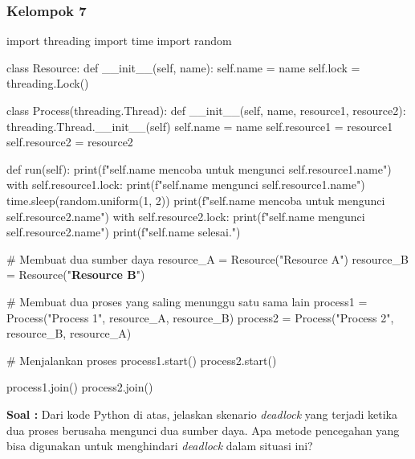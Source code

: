 \documentclass[12pt]{article}
\begin{document}
\subsubsection{Kelompok 7}
\begin{python}
import threading
import time
import random

class Resource:
    def __init__(self, name):
        self.name = name
        self.lock = threading.Lock()

class Process(threading.Thread):
    def __init__(self, name, resource1, resource2):
        threading.Thread.__init__(self)
        self.name = name
        self.resource1 = resource1
        self.resource2 = resource2

    def run(self):
        print(f"{self.name} mencoba untuk mengunci {self.resource1.name}")
        with self.resource1.lock:
            print(f"{self.name} mengunci {self.resource1.name}")
            time.sleep(random.uniform(1, 2))
            print(f"{self.name} mencoba untuk mengunci {self.resource2.name}")
            with self.resource2.lock:
                print(f"{self.name} mengunci {self.resource2.name}")
        print(f"{self.name} selesai.")

# Membuat dua sumber daya
resource_A = Resource("Resource A")
resource_B = Resource("\textbf{Resource B}")

# Membuat dua proses yang saling menunggu satu sama lain
process1 = Process("Process 1", resource_A, resource_B)
process2 = Process("Process 2", resource_B, resource_A)

# Menjalankan proses
process1.start()
process2.start()

process1.join()
process2.join()
\end{python}

\textbf{Soal : }
Dari kode Python di atas, jelaskan skenario \textit{deadlock} yang terjadi ketika dua proses berusaha mengunci dua sumber daya. Apa metode pencegahan yang bisa digunakan untuk menghindari \textit{deadlock} dalam situasi ini? \\
\end{document}
